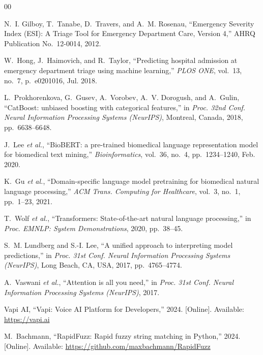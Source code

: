 \documentclass[conference]{IEEEtran}
\begin{document}
\balance
\begin{thebibliography}{00}

N.~I. Gilboy, T.~Tanabe, D.~Travers, and A.~M. Rosenau,
``Emergency Severity Index (ESI): A Triage Tool for Emergency Department Care, Version 4,''
AHRQ Publication No.\ 12-0014, 2012.

W.~Hong, J.~Haimovich, and R.~Taylor,
``Predicting hospital admission at emergency department triage using machine learning,''
\textit{PLOS ONE}, vol.~13, no.~7, p.~e0201016, Jul. 2018.

L.~Prokhorenkova, G.~Gusev, A.~Vorobev, A.~V. Dorogush, and A.~Gulin,
``CatBoost: unbiased boosting with categorical features,''
in \textit{Proc. 32nd Conf. Neural Information Processing Systems (NeurIPS)},
Montreal, Canada, 2018, pp.~6638--6648.

J.~Lee \textit{et al.},
``BioBERT: a pre-trained biomedical language representation model for biomedical text mining,''
\textit{Bioinformatics}, vol.~36, no.~4, pp.~1234--1240, Feb. 2020.

K.~Gu \textit{et al.},
``Domain-specific language model pretraining for biomedical natural language processing,''
\textit{ACM Trans. Computing for Healthcare}, vol.~3, no.~1, pp.~1--23, 2021.

T.~Wolf \textit{et al.},
``Transformers: State-of-the-art natural language processing,''
in \textit{Proc. EMNLP: System Demonstrations}, 2020, pp.~38--45.

S.~M. Lundberg and S.-I. Lee,
``A unified approach to interpreting model predictions,''
in \textit{Proc. 31st Conf. Neural Information Processing Systems (NeurIPS)},
Long Beach, CA, USA, 2017, pp.~4765--4774.

A.~Vaswani \textit{et al.},
``Attention is all you need,''
in \textit{Proc. 31st Conf. Neural Information Processing Systems (NeurIPS)}, 2017.

Vapi AI, ``Vapi: Voice AI Platform for Developers,'' 2024. [Online]. Available: \url{https://vapi.ai}

M.~Bachmann,
``RapidFuzz: Rapid fuzzy string matching in Python,''
2024. [Online]. Available: \url{https://github.com/maxbachmann/RapidFuzz}

\end{thebibliography}
\end{document}
